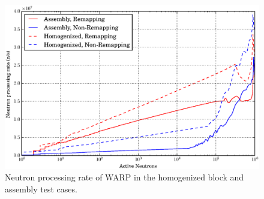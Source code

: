 \begin{figure}[h!]
\centering
\includegraphics[width=\textwidth]{graphics/finalresults/process_rate.eps}
\caption{Neutron processing rate of WARP in the homogenized block and assembly test cases. \label{process_rate} }
\end{figure}

